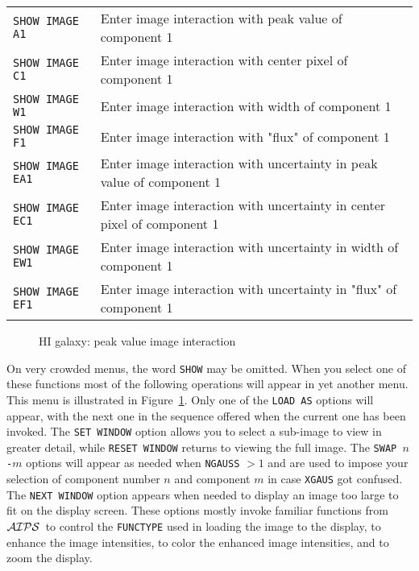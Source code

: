 \documentclass[twoside]{article}
\newcommand{\Hi}[1]{\textcolor{hicol}{#1}}
\newcommand{\AIPS}{{$\cal AIPS\/$}}
\newcommand{\putfig}[1]{\texttt{[image: \#1.eps]}}
\begin{document}
\begin{center}
\begin{tabular}{|l|l|}\hline
 {\tt SHOW IMAGE A1 } & Enter image interaction with peak value of
                     component 1\\
 {\tt SHOW IMAGE C1 } & Enter image interaction with center pixel of
                     component 1\\
 {\tt SHOW IMAGE W1 } & Enter image interaction with width of
                     component 1\\
 {\tt SHOW IMAGE F1 } & Enter image interaction with "flux" of
                     component 1\\
 {\tt SHOW IMAGE EA1} & Enter image interaction with uncertainty in
                     peak value of component 1\\
 {\tt SHOW IMAGE EC1} & Enter image interaction with uncertainty in
                     center pixel of component 1\\
 {\tt SHOW IMAGE EW1} & Enter image interaction with uncertainty in
                     width of component 1\\
 {\tt SHOW IMAGE EF1} & Enter image interaction with uncertainty in
                     "flux" of component 1\\ \hline
\end{tabular}
\end{center}

\begin{figure}
\begin{center}
\resizebox{6.0in}{!}{\putfig{XGAUS.HIpeak}}
\caption{HI galaxy: peak value image interaction}
\label{fig:XGAUS.HIpeak}
\end{center}
\end{figure}

On very crowded menus, the word {\tt SHOW} may be omitted.  When you
select one of these functions most of the following operations will
appear in yet another menu.  This menu is illustrated in
Figure~\ref{fig:XGAUS.HIpeak}.  Only one of the {\tt LOAD AS} options
will appear, with the next one in the sequence offered when the
current one has been invoked.  \Hi{The {\tt SET WINDOW} option allows
you to select a sub-image to view in greater detail, while {\tt RESET
WINDOW} returns to viewing the full image.}  The {\tt SWAP $n$-$m$}
options will appear as needed when {\tt NGAUSS} $ > 1$ and are used to
impose your selection of component number $n$ and component $m$ in
case {\tt XGAUS} got confused.  The {\tt NEXT WINDOW} option appears
when needed to display an image too large to fit on the display
screen.  These options mostly invoke familiar functions from \AIPS\ to
control the {\tt FUNCTYPE} used in loading the image to the display,
to enhance the image intensities, to color the enhanced image
intensities, and to zoom the display.
\end{document}
